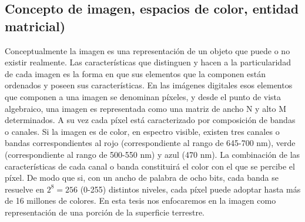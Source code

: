 \subsection{Concepto de imagen, espacios de color, entidad matricial)}
Conceptualmente la imagen es una representación de un objeto que puede o no existir realmente. Las características que distinguen y hacen a la particularidad de cada imagen es la forma en que sus elementos que la componen están ordenados y poseen sus características. En las imágenes digitales esos elementos que componen a una imagen se denominan píxeles, y desde el punto de vista algebraico, una imagen es representada como una matriz de ancho N y alto M determinados. A su vez cada píxel está caracterizado por composición de bandas o canales. Si la imagen es de color, en espectro visible, existen tres canales o bandas correspondientes al rojo (correspondiente al rango de 645-700 nm), verde (correspondiente al rango de 500-550 nm) y azul (470 nm). La combinación de las características de cada canal o banda constituirá el color con el que se percibe el píxel. De modo que si, con un ancho de palabra de ocho bits, cada banda se resuelve en $2^8=256$ (0-255) distintos niveles, cada píxel puede adoptar hasta más de 16 millones de colores.
En esta tesis nos enfocaremos en la imagen como representación de una porción de la superficie terrestre.\\
